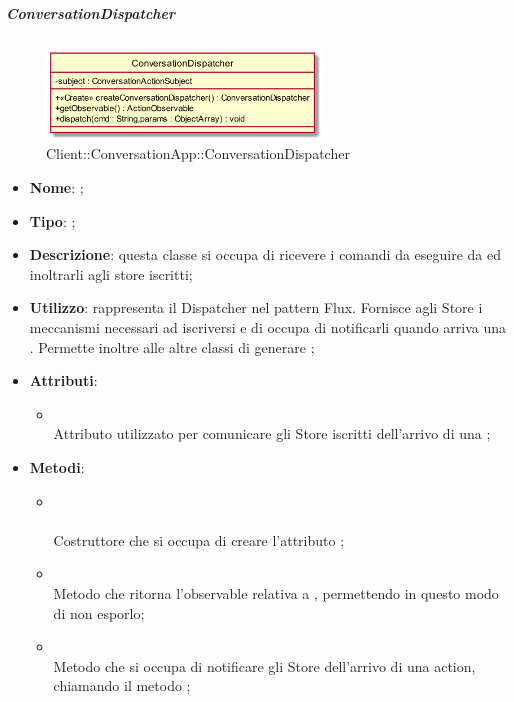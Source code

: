 \hypertarget{ConversationDispatcher_label}{\subparagraph{ConversationDispatcher}}
\begin{figure}[h]
	\centering
	\includegraphics[width=0.65\textwidth,height=\textheight,keepaspectratio]{images/ClassConversationDispatcher.png}
	\caption{Client::ConversationApp::ConversationDispatcher}
\end{figure}
\begin{itemize}
	\item \textbf{Nome}: ;
	\item \textbf{Tipo}: ;
	\item \textbf{Descrizione}: questa classe si occupa di ricevere i comandi da eseguire da  ed inoltrarli agli store iscritti;
	\item \textbf{Utilizzo}: rappresenta il Dispatcher nel pattern Flux. Fornisce agli Store i meccanismi necessari ad iscriversi e di occupa di notificarli quando arriva una . Permette inoltre alle altre classi di generare ;
	\item \textbf{Attributi}:
	\begin{itemize}
		\item[]  \\
		Attributo utilizzato per comunicare gli Store iscritti dell'arrivo di una ;
	\end{itemize}
	\item \textbf{Metodi}:
	\begin{itemize}
		\item[] \\ \\		Costruttore che si occupa di creare l'attributo ;\\
		\item[]  \\		Metodo che ritorna l'observable relativa a , permettendo in questo modo di non esporlo;\\
		\item[]  \\		Metodo che si occupa di notificare gli Store dell'arrivo di una action, chiamando il metodo ;\\

\end{itemize}
\end{itemize}
